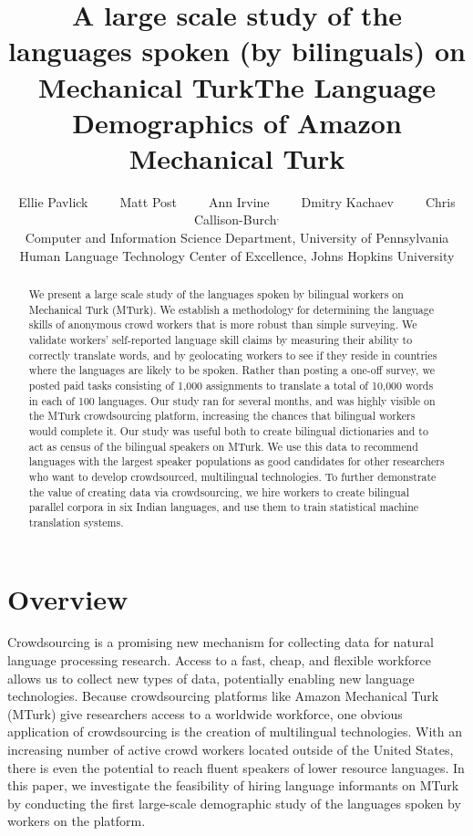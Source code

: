\documentclass[11pt]{article}
\title{A large scale study of the languages spoken (by bilinguals) on Mechanical Turk}
\title{The Language Demographics of  Amazon Mechanical Turk}
\author{Ellie Pavlick\affliationPenn \ \ \ \ \ Matt Post\affliationJHU \ \ \ \ \  Ann Irvine\affliationJHU  \ \ \ \ \ Dmitry Kachaev\affliationJHU  \ \ \ \ \  Chris Callison-Burch\affliationPenn$^{,}$\affliationJHU \\
\affliationPenn Computer and Information Science Department, University of Pennsylvania \\
\affliationJHU Human Language Technology Center of Excellence, Johns Hopkins University \\
  }
\date{}
\begin{document}
\maketitle

\begin{abstract}
We present a large scale study of the languages spoken by bilingual workers on Mechanical Turk (MTurk).  
We establish a  methodology for determining the language skills of anonymous crowd workers that is more robust than simple surveying.  We validate workers' self-reported language skill claims by measuring their ability to correctly translate words, and by geolocating workers to see if they reside in countries where the languages are likely to be spoken. Rather than posting a one-off survey, we posted paid tasks consisting of 1,000 assignments to translate a total of 10,000 words in each of 100 languages.  Our study ran for several months, and was highly visible on the MTurk crowdsourcing platform, increasing the chances that bilingual workers would complete it.  Our study was useful both to create bilingual dictionaries and to act as census of the bilingual speakers on MTurk.  We use this data to recommend languages with the largest speaker populations as good candidates for other researchers who want to  develop crowdsourced, multilingual technologies. To further demonstrate the value of creating data via crowdsourcing, we hire workers to create bilingual parallel corpora in six Indian languages, and use them to train statistical machine translation systems. 

\end{abstract}

\section{Overview}
Crowdsourcing is a promising new mechanism for collecting data for natural language processing research. Access to a fast, cheap, and flexible workforce allows us to collect new types of data, potentially enabling new language technologies.
Because crowdsourcing platforms like Amazon Mechanical Turk (MTurk) give researchers access to a worldwide workforce, one obvious application of crowdsourcing is the creation of multilingual technologies. 
With an increasing number of active crowd workers located outside of the United States, there is even the potential to reach fluent speakers of lower resource languages.
In this paper, we investigate the feasibility of hiring language informants on MTurk by conducting the first large-scale demographic study of the languages spoken by workers on the platform. 
\end{document}
